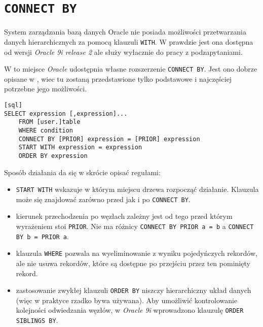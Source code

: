 \section{\texttt{CONNECT BY}}






System zarządzania bazą danych Oracle nie posiada możliwości przetwarzania danych hierarchicznych za pomocą klauzuli \texttt{WITH}.
W prawdzie jest ona dostępna od wersji \emph{Oracle 9i release 2} ale służy wyłacznie do pracy z podzapytaniami.


W to miejsce \emph{Oracle} udostępnia własne rozszerzenie \texttt{CONNECT BY}. 
Jest ono dobrze opisane w \cite{oracle-ref11}, wiec tu zostaną przedstawione tylko podstawowe i najczęściej potrzebne jego możliwości.



\begin{verbatim}[sql]
SELECT expression [,expression]...
    FROM [user.]table
    WHERE condition
    CONNECT BY [PRIOR] expression = [PRIOR] expression
    START WITH expression = expression
    ORDER BY expression
\end{verbatim}


Sposób działania da się w skrócie opisać regułami:
\begin{itemize}
    \item \texttt{START WITH} wskazuje w którym miejscu drzewa rozpocząć działanie. 
        Klauzula może się znajdować zarówno przed jak i po \texttt{CONNECT BY}.
    \item kierunek przechodzenia po węzłach zależny jest od tego przed którym wyrażeniem stoi \texttt{PRIOR}.
         Nie ma różnicy \verb|CONNECT BY PRIOR a = b| a \verb|CONNECT BY b = PRIOR a|.
    \item klauzula \texttt{WHERE} pozwala na wyeliminowanie z wyniku pojedyńczych rekordów, 
        ale nie usuwa rekordów, które są dostępne po przejściu przez ten pominięty rekord.
    \item zastosowanie zwykłej klauzuli \texttt{ORDER BY} niszczy hierarchiczny układ danych 
        (więc w praktyce rzadko bywa używana).
        Aby umożliwić kontrolowanie kolejności odwiedzania węzłów, 
        w \emph{Oracle 9i} wprowadzono klauzulę \texttt{ORDER SIBLINGS BY}.
\end{itemize}


